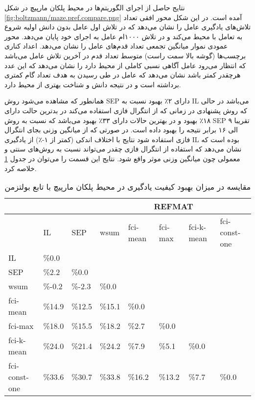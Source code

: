  نتایج حاصل از اجرای الگوریتم‌ها در محیط پلکان مارپیچ در شکل
\ref{fig:boltzmann/maze.pref.compare.png}
آمده است. در این شکل محور افقی تعداد تلاش‌های یادگیری عامل را نشان می‌دهد که در تلاش اول عامل بدون دانش اولیه شروع به تعامل با محیط می‌کند و در تلاش ۱۰۰۰ام عامل به اجرای خود پایان می‌دهد. محور عمودی نموار میانگین تجمعی تعداد قدم‌های عامل را نشان می‌دهد. اعداد کناری برچسب‌ها (گوشه بالا سمت راست) متوسط تعداد قدم‌ در آخرین تلاش عامل می‌باشد که انتظار می‌رود عامل آگاهی نسبی کاملی از محیط دارد را نشان می‌دهد که این عدد هرچقدر کمتر باشد نشان می‌دهد که عامل در طی رسیدن به هدف تعداد گام کمتری برداشته است و در نتیجه دانش و شناخت بهتری از محیط دارد.


همانطور که مشاهده می‌شود روش SEP دارای ۲٪ بهبود نسبت به IL می‌باشد در حالی که روش پشنهادی در زمانی که از انتگرال فازی استفاده می‌کند در بدترین حالت دارای ۱۸٪ بهبود و در بهترین حالات دارای ۳۳٪ بهبود می‌باشد که نسبت به روش SEP تقریبا ۹ الی ۱۶ برابر نتیجه را بهبود داده است. در صورتی که از میانگین وزنی بجای انتگرال فازی استفاده شود نتایج با اختلاف اندکی (کمتر از ۱-٪)  از یادگیری IL بوده است که نشان ‌می‌دهد که استفاده از انتگرال فازی چقدر می‌تواند نسبت به روش‌های سنتی و معمولی چون میانگین وزنی موثر واقع شود. نتایج این قسمت را می‌توان در جدول
\ref{tab:maze_pref_compare}
خلاصه کرد.

\begin{table}
\centering
\caption{مقایسه در میزان بهبود کیفیت یادگیری در محیط پلکان مارپیچ با تابع بولتزمن}\label{tab:maze_pref_compare}
\begin{latin}
\begin{tabular}{|*8{l|}}
\hline
\multicolumn{3}{|c|}{}& \multicolumn{5}{c|}{REFMAT}
\\\hline
& IL & SEP & wsum & fci-mean & fci-max & fci-k-mean & fci-const-one
\\\hline
IL & \%0.0 & & & & & &
\\\hline
SEP & \%2.2 & \%0.0 & & & & &
\\\hline
wsum & \%-0.2 & \%-2.3 & \%0.0 & & & &
\\\hline
fci-mean & \%14.9 & \%12.5 & \%15.1 & \%0.0 & & &
\\\hline
fci-max & \%18.0 & \%15.5 & \%18.2 & \%2.7 & \%0.0 & &
\\\hline
fci-k-mean & \%24.0 & \%21.4 & \%24.2 & \%7.9 & \%5.1 & \%0.0 &
\\\hline
fci-const-one & \%33.6 & \%30.7 & \%33.8 & \%16.2 & \%13.2 & \%7.7 & \%0.0
\\\hline
\end{tabular}
\end{latin}
\end{table}

